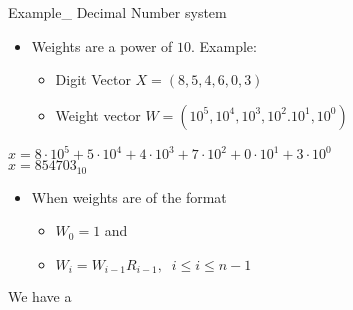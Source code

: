 \begin{parag}{Example_ Decimal Number system}
    \begin{itemize}
        \item Weights are a power of $10$. Example:
        \begin{itemize}
            \item Digit Vector $X = (8, 5, 4, 6, 0, 3)$
            \item Weight vector $W = (10^5, 10^4, 10^3, 10^2. 10^1, 10^0)$
        \end{itemize}
    \end{itemize}
    $x = 8 \cdot 10^5 + 5 \cdot 10^4 + 4\cdot 10^3 + 7 \cdot 10^2 + 0 \cdot 10^1 + 3 \cdot 10^0$
    \\
    $x = 854703_{10}$
    \begin{itemize}
        \item When weights are of the format
        \begin{itemize}
            \item $W_0 = 1$ and 
            \item $W_i = W_{i-1}R_{i-1}, \; \; i \leq i \leq n-1$
        \end{itemize}
    \end{itemize}
    We have a 
\end{parag}
